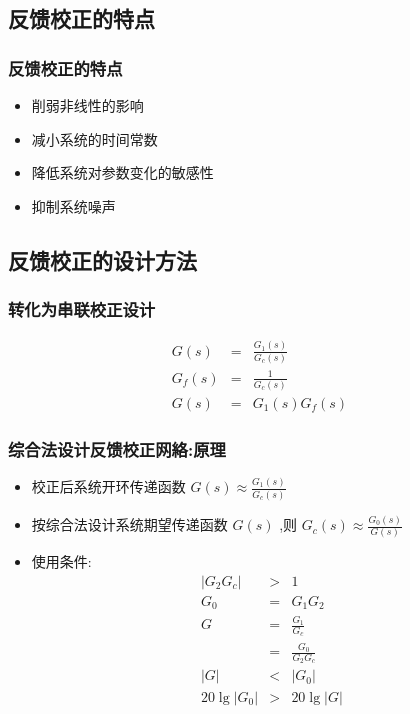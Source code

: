 \documentclass[table]{article}
\begin{document}
\subsection{反馈校正的特点}
\label{sec-3-2}
\begin{frame}
\frametitle{反馈校正的特点}
\label{sec-3-2-1}

\begin{itemize}
\item <2->削弱非线性的影响
\item <3->减小系统的时间常数
\item <4->降低系统对参数变化的敏感性
\item <5->抑制系统噪声
\end{itemize}
\end{frame}
\subsection{反馈校正的设计方法}
\label{sec-3-3}
\begin{frame}
\frametitle{转化为串联校正设计}
\label{sec-3-3-1}

\begin{eqnarray*}
G(s) &=& \frac{G_1(s)}{G_c(s)} \\
G_f(s) & = &\frac{1}{G_c(s)} \\
G(s) &=& G_1(s)G_f(s)
\end{eqnarray*}
\end{frame}
\begin{frame}
\frametitle{综合法设计反馈校正网絡:原理}
\label{sec-3-3-2}

\begin{itemize}
\item 校正后系统开环传递函数  $G(s)\approx\frac{G_1(s)}{G_c(s)}$
\item <2->按综合法设计系统期望传递函数  $G(s)$  ,则 $G_c(s)\approx\frac{G_0(s)}{G(s)}$
\item <3->使用条件:
      \begin{eqnarray*}
       |G_2 G_c| & > & 1 \\
       G_0 & = & G_1 G_2 \\
       G &=& \frac{G_1}{G_c}\\
	 &=& \frac{G_0}{G_2 G_c} \\
       |G| & <& | G_{0} | \\ 
       20\lg|G_0|&>&20\lg|G|
      \end{eqnarray*}
\end{itemize}
\end{frame}
\end{document}
